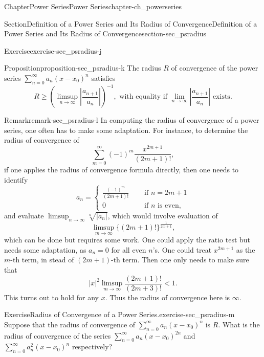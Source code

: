 \documentclass[oneside,10pt,]{book}
\numberwithin{equation}{section}
\newcommand{\amp}{&}
\begin{document}
\begin{chapterptx}{Chapter}{Power Series}{}{Power Series}{}{}{chapter-ch_powerseries}
\begin{sectionptx}{Section}{Definition of a Power Series and Its Radius of Convergence}{}{Definition of a Power Series and Its Radius of Convergence}{}{}{section-sec_psradius}
\begin{inlineexercise}{Exercise}{}{exercise-sec_psradius-j}
\begin{enumerate}
\end{enumerate}
\end{inlineexercise}%
\begin{proposition}{Proposition}{}{}{proposition-sec_psradius-k}%
The radius \(R\) of convergence of the power series  \(\sum_{n=0}^{\infty} a_{n}(x-x_{0})^{n}\)  satisfies%
\begin{equation*}
R\ge \left( \limsup_{n\to \infty} |\frac{a_{n+1}}{a_n}|\right)^{-1}, 
\text{ with equality if $\lim_{n\to \infty} |\frac{a_{n+1}}{a_n}|$ exists}.
\end{equation*}
\end{proposition}
\begin{remark}{Remark}{}{remark-sec_psradius-l}%
In computing the radius of convergence of a power series, one often has to make some adaptation. For instance, to determine the radius of convergence of%
\begin{equation*}
\sum_{m=0}^{\infty} (-1)^{m}\frac{x^{2m+1}}{(2m+1)!},
\end{equation*}
if one applies the radius of convergence formula directly, then one needs to identify%
\begin{equation*}
a_{n}=\begin{cases} \frac{(-1)^{m}}{(2m+1)!} \amp \quad\text{ if } n=2m+1 \\
0 \amp \quad\text{ if } n \text{ is even},
\end{cases}
\end{equation*}
and evaluate \(\limsup_{n \to\infty} \sqrt[n]{|a_{n}|}\), which would involve evaluation of%
\begin{equation*}
\limsup_{m \to\infty} \{(2m+1)!\}^{\frac{1}{2m+1}}\text{,}
\end{equation*}
which can be done but requires some work.  One could apply the ratio test but needs some adaptation, as \(a_{n}=0\) for all even \(n\)'s. One could  treat \(x^{2m+1}\) as the \(m\)-th term, in stead of \((2m+1)\)-th term. Then one only needs to make sure that%
\begin{equation*}
|x|^{2} \limsup_{m\to \infty} \frac{(2m+1)!}{(2m+3)!} < 1.
\end{equation*}
This turns out to hold for any \(x\). Thus the radius of convergence here is \(\infty\).\end{remark}
\begin{inlineexercise}{Exercise}{Radius of Convergence of a Power Series.}{exercise-sec_psradius-m}%
Suppose that the radius of convergence of \(\sum_{n=0}^{\infty} a_{n}(x-x_{0})^{n}\) is \(R\). What is the radius of convergence of the series \(\sum_{n=0}^{\infty} a_{n}(x-x_{0})^{2n}\) and \(\sum_{n=0}^{\infty} a_{n}^{2}(x-x_{0})^{n}\) respectively?\end{inlineexercise}%

\end{sectionptx}
\end{chapterptx}
\end{document}
